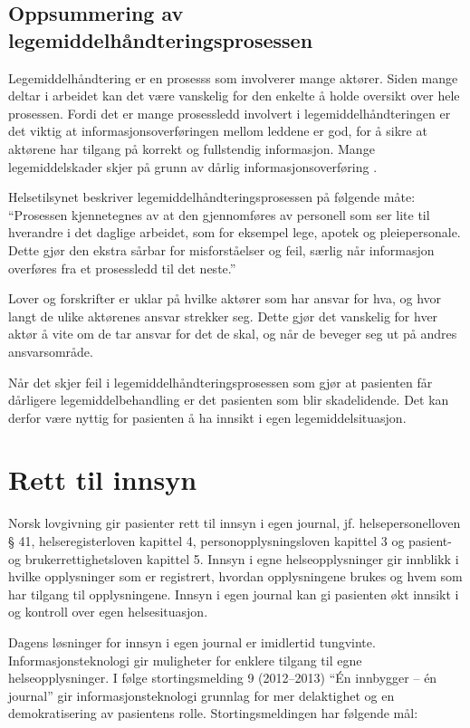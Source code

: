 \subsection{Oppsummering av legemiddelhåndteringsprosessen}
Legemiddelhåndtering er en prosesss som involverer mange aktører. Siden mange deltar i arbeidet kan det være vanskelig for den enkelte å holde oversikt over hele prosessen. Fordi det er mange prosessledd involvert i legemiddelhåndteringen er det viktig at informasjonsoverføringen mellom leddene er god, for å sikre at aktørene har tilgang på korrekt og fullstendig informasjon. Mange legemiddelskader skjer på grunn av dårlig informasjonsoverføring \citep{HelsetilsynetRapport, komLegemidler}.

Helsetilsynet beskriver legemiddelhåndteringsprosessen på følgende måte:
“Prosessen kjennetegnes av at den gjennomføres av personell som ser lite til hverandre i det daglige arbeidet, som for eksempel lege, apotek og pleiepersonale. Dette gjør den ekstra sårbar for misforståelser og feil, særlig når informasjon overføres fra et prosessledd til det neste.” \citep{HelsetilsynetRapport} 

Lover og forskrifter er uklar på hvilke aktører som har ansvar for hva, og hvor langt de ulike aktørenes ansvar strekker seg. Dette gjør det vanskelig for hver aktør å vite om de tar ansvar for det de skal, og når de beveger seg ut på andres ansvarsområde. 

Når det skjer feil i legemiddelhåndteringsprosessen som gjør at pasienten får dårligere legemiddelbehandling er det pasienten som blir skadelidende. Det kan derfor være nyttig for pasienten å ha innsikt i egen legemiddelsituasjon. 


\section{Rett til innsyn}
Norsk lovgivning gir pasienter rett til innsyn i egen journal, jf. helsepersonelloven § 41, helseregisterloven kapittel 4, personopplysningsloven kapittel 3 og pasient- og brukerrettighetsloven kapittel 5. Innsyn i egne helseopplysninger gir innblikk i hvilke opplysninger som er registrert, hvordan opplysningene brukes og hvem som har tilgang til opplysningene. Innsyn i egen journal kan gi pasienten økt innsikt i og kontroll over egen helsesituasjon.

Dagens løsninger for innsyn i egen journal er imidlertid tungvinte. Informasjonsteknologi gir muligheter for enklere tilgang til egne helseopplysninger. I følge stortingsmelding 9 (2012–2013) “Én innbygger – én journal” gir informasjonsteknologi grunnlag for mer delaktighet og en demokratisering av pasientens rolle. Stortingsmeldingen har følgende mål:


